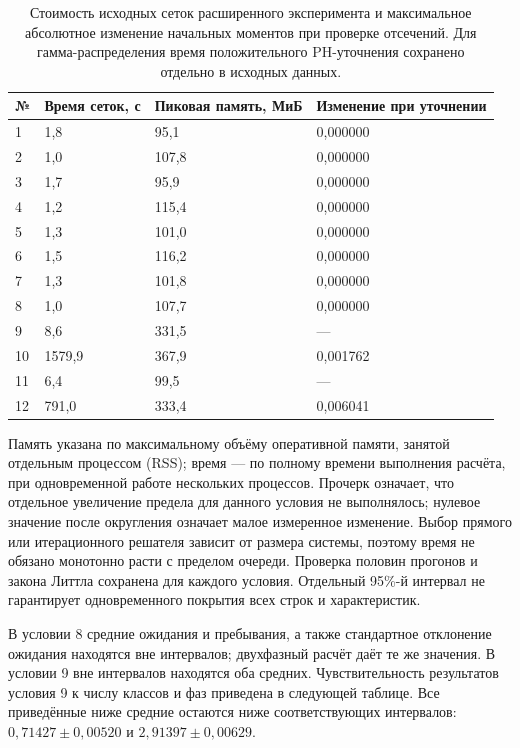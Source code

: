 \documentclass[a4paper,12pt]{article}
\begin{document}
\begin{table}[!htbp]
\centering\small\setlength{\tabcolsep}{2pt}
\begin{tabular}{@{}p{0.94cm}p{4.25cm}p{4.72cm}p{5.67cm}@{}}
\toprule
№ & Время сеток, с & Пиковая память, МиБ & Изменение при уточнении \\
\midrule
1 & 1,8 & 95,1 & 0,000000 \\
2 & 1,0 & 107,8 & 0,000000 \\
3 & 1,7 & 95,9 & 0,000000 \\
4 & 1,2 & 115,4 & 0,000000 \\
5 & 1,3 & 101,0 & 0,000000 \\
6 & 1,5 & 116,2 & 0,000000 \\
7 & 1,3 & 101,8 & 0,000000 \\
8 & 1,0 & 107,7 & 0,000000 \\
9 & 8,6 & 331,5 & — \\
10 & 1579,9 & 367,9 & 0,001762 \\
11 & 6,4 & 99,5 & — \\
12 & 791,0 & 333,4 & 0,006041 \\
\bottomrule
\end{tabular}
\caption{Стоимость исходных сеток расширенного эксперимента и максимальное абсолютное изменение начальных моментов при проверке отсечений. Для гамма-распределения время положительного PH-уточнения сохранено отдельно в исходных данных.}
\label{tab:cost}
\end{table}

Память указана по максимальному объёму оперативной памяти, занятой отдельным процессом (RSS); время --- по полному времени выполнения расчёта, при одновременной работе нескольких процессов. Прочерк означает, что отдельное увеличение предела для данного условия не выполнялось; нулевое значение после округления означает малое измеренное изменение. Выбор прямого или итерационного решателя зависит от размера системы, поэтому время не обязано монотонно расти с пределом очереди. Проверка половин прогонов и закона Литтла сохранена для каждого условия. Отдельный 95\%-й интервал не гарантирует одновременного покрытия всех строк и характеристик.

В условии 8 средние ожидания и пребывания, а также стандартное отклонение ожидания находятся вне интервалов; двухфазный расчёт даёт те же значения. В условии 9 вне интервалов находятся оба средних. Чувствительность результатов условия 9 к числу классов и фаз приведена в следующей таблице. Все приведённые ниже средние остаются ниже соответствующих интервалов: \(0{,}71427\pm0{,}00520\) и \(2{,}91397\pm0{,}00629\).
\end{document}
